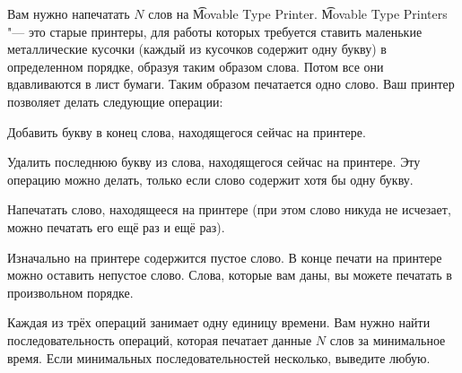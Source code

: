 Вам нужно напечатать $N$ слов на \t{Movable Type Printer}.
\t{Movable Type Printers} "--- это старые принтеры, для работы которых
требуется ставить
маленькие металлические кусочки (каждый из кусочков содержит одну букву)
в определенном порядке, образуя таким образом слова. Потом все они вдавливаются
в лист бумаги. Таким образом печатается одно слово. Ваш принтер позволяет
делать следующие операции:

\begin{shortitems}
  \item Добавить букву в конец слова, находящегося сейчас на принтере.
  \item Удалить последнюю букву из слова, находящегося сейчас на принтере.
    Эту операцию можно делать, только если слово содержит хотя бы одну букву.
  \item Напечатать слово, находящееся на принтере (при этом слово никуда
    не исчезает, можно печатать его ещё раз и ещё раз).
\end{shortitems}

Изначально на принтере содержится пустое слово. В конце печати на принтере
можно оставить непустое слово. Слова, которые вам даны, вы можете печатать
в произвольном порядке.

Каждая из трёх операций занимает одну единицу времени. Вам нужно найти
последовательность операций, которая печатает данные $N$ слов за минимальное
время. Если минимальных последовательностей несколько, выведите любую.


